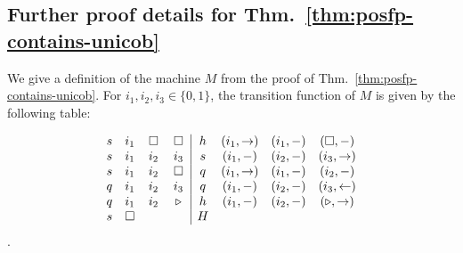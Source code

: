 \documentclass{lmcs}
\begin{document}
\subsection{Further proof details for Thm.~\ref{thm:posfp-contains-unicob}}

We give a definition of the machine $M$ from the proof of Thm.~\ref{thm:posfp-contains-unicob}.
For $i_1 , i_2 , i_3 \in\{ 0,1 \}$, the transition function of $M$ is given by the following table:

$$\begin{array}{cccc|cccc}
s & i_1 & \square & \square & h  & (i_1 ,\rightarrow )& (i_1 , - ) & (\square, - )\\
s & i_1 & i_2 & i_3 & s & (i_1 , - ) & (i_2 , - ) & (i_3 ,\rightarrow )\\
s & i_1 & i_2 & \square & q & (i_1 , \rightarrow ) & (i_1 , - ) & (i_2 ,- )\\
q & i_1 & i_2 & i_3 & q & (i_1 , - ) & (i_2 , - ) & (i_3 ,\leftarrow )\\
q & i_1 & i_2 & \triangleright & h & (i_1 , - ) & (i_2 , - ) & (\triangleright ,\rightarrow )\\
s & \square & \quad & \quad & H & \quad & \quad & \quad
\end{array}
$$.
\end{document}
